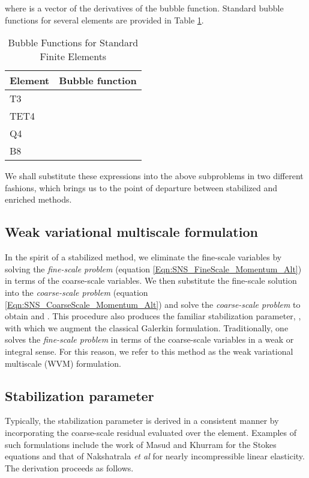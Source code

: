\documentclass[11pt]{amsart}
\begin{document}
where  is a  vector of the derivatives of the bubble function.
Standard bubble functions for several elements are provided in Table \ref{table:BubbleDefs}. 
\begin{table}[htb]
\caption{Bubble Functions for Standard Finite Elements}
\centering
\begin{tabular}{l l}
\hline
Element   & Bubble function \\ 
\hline
T3 &  \\ 
TET4 &  \\
Q4 & \\
B8 &  \\
\hline
\end{tabular}
\label{table:BubbleDefs}
\end{table}

We shall substitute these expressions into the above subproblems in two different fashions, which  brings us to the point of departure between stabilized and enriched methods. \subsection{Weak variational multiscale formulation}
In the spirit of a stabilized method, we eliminate the fine-scale variables by solving the \emph{fine-scale problem} (equation \eqref{Eqn:SNS_FineScale_Momentum_Alt}) in terms of the coarse-scale variables.  We then substitute the fine-scale solution into the 
\emph{coarse-scale problem} (equation \eqref{Eqn:SNS_CoarseScale_Momentum_Alt}) and solve 
the \emph{coarse-scale problem} to obtain  
and . This procedure also produces the familiar stabilization parameter, , with which we augment the classical Galerkin formulation.  Traditionally, one solves the \emph{fine-scale problem} in terms of the coarse-scale variables in a weak or integral sense.  For this reason, we refer to this method as the weak variational multiscale (WVM) formulation. 

\subsection{Stabilization parameter}
Typically, the stabilization parameter is derived in a consistent manner by incorporating the coarse-scale residual evaluated over the element.  Examples of such formulations include the work of Masud and Khurram \cite{Masud} for the Stokes equations and that of Nakshatrala \emph{et al} \cite{Nakshatrala} for nearly incompressible linear elasticity.  The derivation proceeds as follows.
\end{document}
